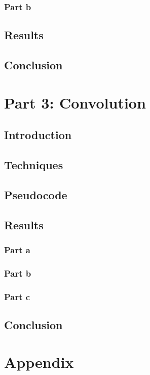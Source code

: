 \documentclass[a4paper]{article}
\begin{document}
	\subsubsection{Part b}
	\subsection{Results}
	\subsection{Conclusion}
	\section{Part 3: Convolution}
	\subsection{Introduction}
	\subsection{Techniques}
	\subsection{Pseudocode}
	\subsection{Results}
	\subsubsection{Part a}
	\subsubsection{Part b}
	\subsubsection{Part c}
	\subsection{Conclusion}
	\section{Appendix}
\end{document}
